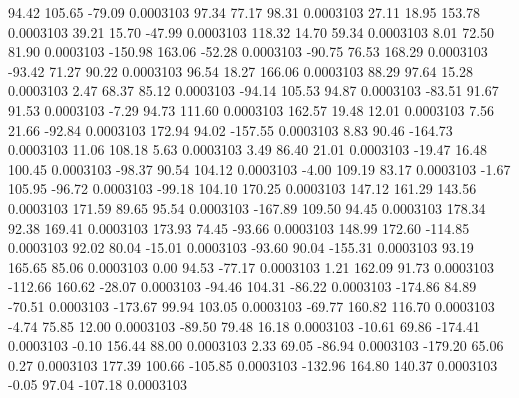        94.42      105.65      -79.09     0.0003103
       97.34       77.17       98.31     0.0003103
       27.11       18.95      153.78     0.0003103
       39.21       15.70      -47.99     0.0003103
      118.32       14.70       59.34     0.0003103
        8.01       72.50       81.90     0.0003103
     -150.98      163.06      -52.28     0.0003103
      -90.75       76.53      168.29     0.0003103
      -93.42       71.27       90.22     0.0003103
       96.54       18.27      166.06     0.0003103
       88.29       97.64       15.28     0.0003103
        2.47       68.37       85.12     0.0003103
      -94.14      105.53       94.87     0.0003103
      -83.51       91.67       91.53     0.0003103
       -7.29       94.73      111.60     0.0003103
      162.57       19.48       12.01     0.0003103
        7.56       21.66      -92.84     0.0003103
      172.94       94.02     -157.55     0.0003103
        8.83       90.46     -164.73     0.0003103
       11.06      108.18        5.63     0.0003103
        3.49       86.40       21.01     0.0003103
      -19.47       16.48      100.45     0.0003103
      -98.37       90.54      104.12     0.0003103
       -4.00      109.19       83.17     0.0003103
       -1.67      105.95      -96.72     0.0003103
      -99.18      104.10      170.25     0.0003103
      147.12      161.29      143.56     0.0003103
      171.59       89.65       95.54     0.0003103
     -167.89      109.50       94.45     0.0003103
      178.34       92.38      169.41     0.0003103
      173.93       74.45      -93.66     0.0003103
      148.99      172.60     -114.85     0.0003103
       92.02       80.04      -15.01     0.0003103
      -93.60       90.04     -155.31     0.0003103
       93.19      165.65       85.06     0.0003103
        0.00       94.53      -77.17     0.0003103
        1.21      162.09       91.73     0.0003103
     -112.66      160.62      -28.07     0.0003103
      -94.46      104.31      -86.22     0.0003103
     -174.86       84.89      -70.51     0.0003103
     -173.67       99.94      103.05     0.0003103
      -69.77      160.82      116.70     0.0003103
       -4.74       75.85       12.00     0.0003103
      -89.50       79.48       16.18     0.0003103
      -10.61       69.86     -174.41     0.0003103
       -0.10      156.44       88.00     0.0003103
        2.33       69.05      -86.94     0.0003103
     -179.20       65.06        0.27     0.0003103
      177.39      100.66     -105.85     0.0003103
     -132.96      164.80      140.37     0.0003103
       -0.05       97.04     -107.18     0.0003103
